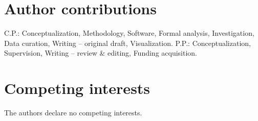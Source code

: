 \documentclass[11pt,a4paper]{article}
\begin{document}
\section*{Author contributions}
C.P.: Conceptualization, Methodology, Software, Formal analysis,
Investigation, Data curation, Writing -- original draft, Visualization.
P.P.: Conceptualization, Supervision, Writing -- review \& editing,
Funding acquisition.

\section*{Competing interests}
The authors declare no competing interests.


\end{document}
